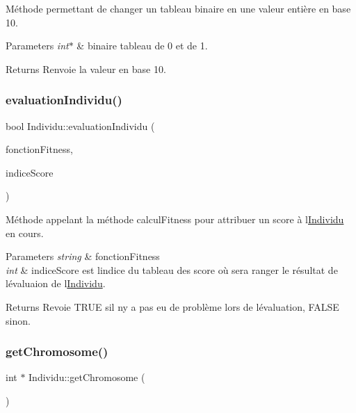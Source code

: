 Méthode permettant de changer un tableau binaire en une valeur entière en base 10. 


\begin{DoxyParams}{Parameters}
{\em int$\ast$} & binaire tableau de 0 et de 1. \\
\hline
\end{DoxyParams}
\begin{DoxyReturn}{Returns}
Renvoie la valeur en base 10. 
\end{DoxyReturn}
\mbox{\label{class_individu_a85811f58ed4c57e4ae584117d553cc7c}} 
\subsubsection{\texorpdfstring{evaluation\+Individu()}{evaluationIndividu()}}
{\footnotesize\ttfamily bool Individu\+::evaluation\+Individu (\begin{DoxyParamCaption}\item[{string}]{fonction\+Fitness,  }\item[{int}]{indice\+Score }\end{DoxyParamCaption})}



Méthode appelant la méthode calcul\+Fitness pour attribuer un score à l\textquotesingle{}\hyperlink{class_individu}{Individu} en cours. 


\begin{DoxyParams}{Parameters}
{\em string} & fonction\+Fitness \\
\hline
{\em int} & indice\+Score est l\textquotesingle{}indice du tableau des score où sera ranger le résultat de l\textquotesingle{}évaluaion de l\textquotesingle{}\hyperlink{class_individu}{Individu}. \\
\hline
\end{DoxyParams}
\begin{DoxyReturn}{Returns}
Revoie T\+R\+UE s\textquotesingle{}il n\textquotesingle{}y a pas eu de problème lors de l\textquotesingle{}évaluation, F\+A\+L\+SE sinon. 
\end{DoxyReturn}
\mbox{\label{class_individu_a2822cc97c85faa9546bd1a68e5d4c417}} 
\subsubsection{\texorpdfstring{get\+Chromosome()}{getChromosome()}}
{\footnotesize\ttfamily int $\ast$ Individu\+::get\+Chromosome (\begin{DoxyParamCaption}{ }\end{DoxyParamCaption})}



